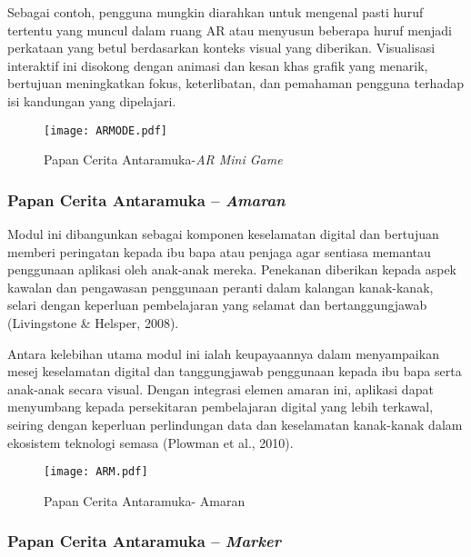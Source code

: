 Sebagai contoh, pengguna mungkin diarahkan untuk mengenal pasti huruf tertentu yang muncul dalam ruang AR atau menyusun beberapa huruf menjadi perkataan yang betul berdasarkan konteks visual yang diberikan. Visualisasi interaktif ini disokong dengan animasi dan kesan khas grafik yang menarik, bertujuan meningkatkan fokus, keterlibatan, dan pemahaman pengguna terhadap isi kandungan yang dipelajari.




    \begin{figure}[h]
        \centering
        \texttt{[image: ARMODE.pdf]}
       \caption{Papan Cerita Antaramuka-\textit{AR Mini Game}}
        \label{fig:MINI}
    \end{figure}

\vspace{6cm}



\subsubsection{Papan Cerita Antaramuka – \textit{Amaran}}

Modul ini dibangunkan sebagai komponen keselamatan digital dan bertujuan memberi peringatan kepada ibu bapa atau penjaga agar sentiasa memantau penggunaan aplikasi oleh anak-anak mereka. Penekanan diberikan kepada aspek kawalan dan pengawasan penggunaan peranti dalam kalangan kanak-kanak, selari dengan keperluan pembelajaran yang selamat dan bertanggungjawab (Livingstone & Helsper, 2008).



Antara kelebihan utama modul ini ialah keupayaannya dalam menyampaikan mesej keselamatan digital dan tanggungjawab penggunaan kepada ibu bapa serta anak-anak secara visual. Dengan integrasi elemen amaran ini, aplikasi dapat menyumbang kepada persekitaran pembelajaran digital yang lebih terkawal, seiring dengan keperluan perlindungan data dan keselamatan kanak-kanak dalam ekosistem teknologi semasa (Plowman et al., 2010).

 
\begin{figure}
    \centering
    \texttt{[image: ARM.pdf]}
   \caption{Papan Cerita Antaramuka- Amaran}
    \label{fig:Antaramuka_Amaranl}
\end{figure}
\vspace{15cm}

\subsubsection{Papan Cerita Antaramuka – \textit{Marker}}

